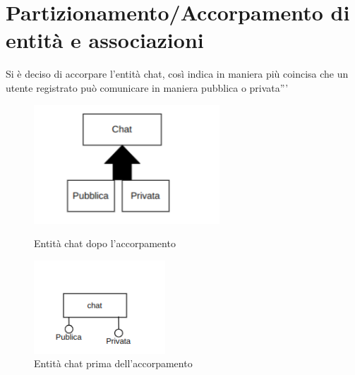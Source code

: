 \section{Partizionamento/Accorpamento di entità e associazioni}
Si è deciso di accorpare l'entità chat, così indica in maniera più coincisa che un utente registrato può comunicare in maniera pubblica o privata'''
\begin{figure}[ht]
    \centering
    \begin{minipage}{.45\textwidth}
        \centering
        \includegraphics[width=0.9\linewidth]{resources/chat_revised.png}
        \caption{Entità chat dopo l'accorpamento}
        \label{Entità chat dopo l'accorpamento}
    \end{minipage}%
    \begin{minipage}{.5\textwidth}
        \centering
        \includegraphics[width=0.9\linewidth]{resources/chat.png}
        \caption{Entità chat prima dell'accorpamento}
        \label{Entità chat prima dell'accorpamento}
    \end{minipage}
\end{figure}

